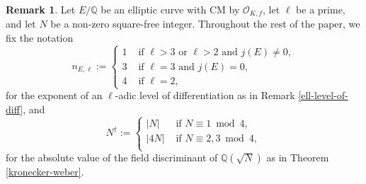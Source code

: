 \documentclass[11pt]{amsart}
\theoremstyle{definition}
\newtheorem{remark}[defn]{Remark}
\newcommand{\Q}{\mathbb{Q}}
\newcommand{\Of}{\mathcal{O}_{K,f}}
\begin{document}
\begin{remark}\label{rem-notation}
    Let $E/\Q$ be an elliptic curve with CM by $\Of$, let $\ell$ be a prime, and let $N$ be a non-zero square-free integer. Throughout the rest of the paper, we fix the notation 
    \[ n_{E, \ell} := \begin{cases}
    1 & \text{ if } \ell > 3 \text{ or } \ell > 2 \text{ and } j(E) \neq 0, \\
    3 & \text{ if } \ell = 3 \text{ and } j(E) = 0, \\
    4 & \text{ if } \ell = 2,
    \end{cases} \]
    for the exponent of an $\ell$-adic level of differentiation as in Remark \ref{ell-level-of-diff}, and 
    \[ N^{\dagger} :=   
\begin{cases}
|N| & \text{ if } N \equiv 1 \bmod 4, \\
|4N| & \text{ if } N \equiv 2,3 \bmod 4, \\
\end{cases} \]
for the absolute value of the field discriminant of $\Q(\sqrt{N})$ as in Theorem \ref{kronecker-weber}.
\end{remark}
\end{document}
